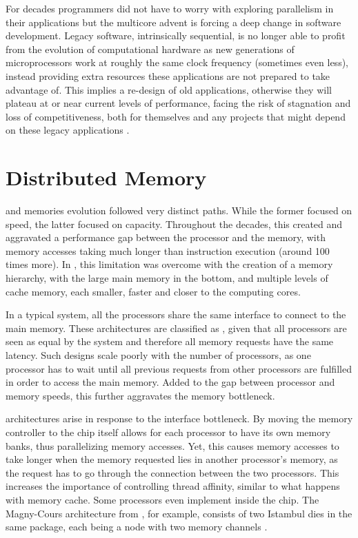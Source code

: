 \documentclass[../thesis]{subfiles}
\begin{document}
	For decades programmers did not have to worry with exploring parallelism in their applications but the multicore advent is forcing a deep change in software development. Legacy software, intrinsically sequential, is no longer able to profit from the evolution of computational hardware as new generations of microprocessors work at roughly the same clock frequency (sometimes even less), instead providing extra resources these applications are not prepared to take advantage of. This implies a re-design of old applications, otherwise they will plateau at or near current levels of performance, facing the risk of stagnation and loss of competitiveness, both for themselves and any projects that might depend on these legacy applications \cite{Farber:2011:RedefiningWhatIsPossible}.

	


		\section{Distributed Memory}
		\label{sec:techbg:distmem}

		\cpus and memories evolution followed very distinct paths. While the former focused on speed, the latter focused on capacity. Throughout the decades, this created and aggravated a performance gap between the processor and the memory, with memory accesses taking much longer than instruction execution (around 100 times more). In \cpus, this limitation was overcome with the creation of a memory hierarchy, with the large main memory in the bottom, and multiple levels of cache memory, each smaller, faster and closer to the computing cores.

		In a typical \smp system, all the processors share the same interface to connect to the main memory. These architectures are classified as \uma, given that all processors are seen as equal by the system and therefore all memory requests have the same latency. Such designs scale poorly with the number of processors, as one processor has to wait until all previous requests from other processors are fulfilled in order to access the main memory. Added to the gap between processor and memory speeds, this further aggravates the memory bottleneck.

		\numa architectures arise in response to the interface bottleneck. By moving the memory controller to the \cpu chip itself allows for each processor to have its own memory banks, thus parallelizing memory accesses. Yet, this causes memory accesses to take longer when the memory requested lies in another processor's memory, as the request has to go through the connection between the two processors. This increases the importance of controlling thread affinity, similar to what happens with memory cache. Some processors even implement \numa inside the chip. The Magny-Cours architecture from \amd, for example, consists of two Istambul dies in the same package, each being a \numa node with two memory channels \cite{AMD:MagnyCours}.
\end{document}
